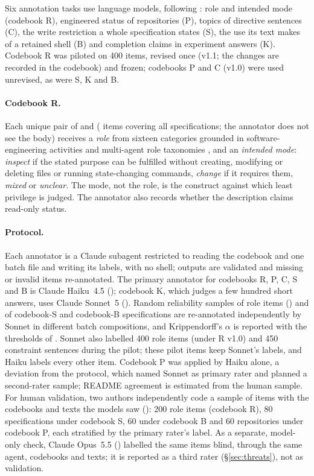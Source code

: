 Six annotation tasks use language models, following \citet{baltes2026guidelines}: role and intended mode (codebook R),
engineered status of repositories (P), topics of directive sentences (C), the write restriction a whole specification
states (S), the use its text makes of a retained shell (B) and completion claims in experiment answers (K). Codebook R
was piloted on 400 items, revised once (v1.1; the changes are recorded in the codebook) and frozen; codebooks P and C
(v1.0) were used unrevised, as were S, K and B.

\paragraph{Codebook R.} Each unique pair of  and  (\nRoleItems{} items covering all
\nSpecsAll{} specifications; the annotator does not see the body) receives a \emph{role} from sixteen categories grounded in software-engineering activities
and multi-agent role taxonomies \citep{he2025lmase}, and an \emph{intended mode}: \emph{inspect} if the stated purpose
can be fulfilled without creating, modifying or deleting files or running state-changing commands, \emph{change} if it
requires them, \emph{mixed} or \emph{unclear}. The mode, not the role, is the construct against which least privilege
is judged. The annotator also records whether the description claims read-only status.

\paragraph{Protocol.} Each annotator is a Claude subagent restricted to reading the codebook and one batch file and
writing its labels, with no shell; outputs are validated and missing or invalid items re-annotated. The primary annotator for
codebooks R, P, C, S and B is Claude Haiku~4.5 (); codebook K, which judges a few
hundred short answers, uses Claude Sonnet~5 (). Random reliability samples of role items
(\nReliabilityItems{}) and of codebook-S and codebook-B specifications are re-annotated independently by Sonnet in
different batch compositions, and Krippendorff's $\alpha$ is reported with the thresholds of
\citet{krippendorff2018content}. Sonnet also labelled 400 role items (under R v1.0) and 450 constraint sentences during
the pilot; these pilot items keep Sonnet's labels, and Haiku labels every other item. Codebook P was applied by Haiku
alone, a deviation from the protocol, which named Sonnet as primary rater and planned a second-rater sample; README
agreement is estimated from the human sample. For human validation, two authors independently code a sample of
\nHumanSample{} items with the codebooks and texts the models saw (): 200 role items
(codebook R), 80 specifications under codebook S, 60 under codebook B and 60 repositories under codebook P, each
stratified by the primary rater's label. As a separate, model-only check, Claude Opus~5.5 ()
labelled the same \nOpusItems{} items blind, through the same agent, codebooks and texts; it is reported as a third
rater (\S\ref{sec:threats}), not as validation.

